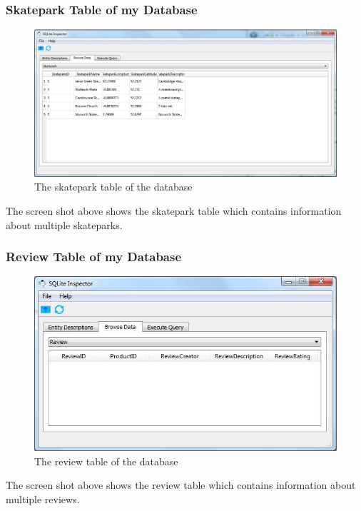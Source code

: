 \subsubsection{Skatepark Table of my Database}
\begin{figure}[H]
    \includegraphics[width=\textwidth]{./Maintenance/Figures/SkateparkTable.jpg}
    \caption{The skatepark table of the database} \label{fig:Skatepark Table}
\end{figure}

The screen shot above shows the skatepark table which contains information about multiple skateparks.


\subsubsection{Review Table of my Database}
\begin{figure}[H]
    \includegraphics[width=\textwidth]{./Maintenance/Figures/ReviewTable.jpg}
    \caption{The review table of the database} \label{fig:Review Table}
\end{figure}

The screen shot above shows the review table which contains information about multiple reviews.


